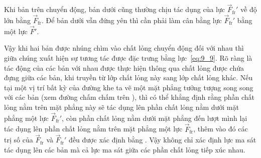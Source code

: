 
Khi bản trên chuyển động, bản dưới cũng thường chịu tác dụng của lực $\vec{F}_{\text{fr}}'$ về độ lớn bằng $\vec{F}_{\text{fr}}$. Để bản dưới vẫn đứng yên thì cần phải làm cân bằng lực $\vec{F}_{\text{fr}}'$ bằng một lực $\vec{F}'$.


Vậy khi hai bản được nhúng chìm vào chất lỏng chuyển động đối với nhau thì giữa chúng xuất hiện sự tương tác được đặc trưng bằng lực~\eqref{eq:9_9}. Rõ ràng là tác động của các bản với nhau được thực hiện thông qua chất lỏng được chứa đựng giữa các bản, khi truyền từ lớp chất lỏng này sang lớp chất lỏng khác. Nếu tại một vị trí bất kỳ của đường khe ta vẽ một mặt phẳng tưởng tượng song song với các bản (xem đường chấm chấm trên ), thì có thể khẳng định rằng phần chất lỏng nằm trên mặt phẳng này sẽ tác dụng lên phần chất lỏng nằm dưới mặt phẳng một lực $\vec{F}_{\text{fr}}'$, còn phần chất lỏng nằm dưới mặt phẳng đến lượt mình lại tác dụng lên phần chất lỏng nằm trên mặt phẳng một lực $\vec{F}_{\text{fr}}$, thêm vào đó các trị số của $\vec{F}_{\text{fr}}$ và $\vec{F}_{\text{fr}}'$ đều được xác định bằng . Vậy  không chỉ xác định lực ma sát tác dụng lên các bản mà cả lực ma sát giữa các phần chất lỏng tiếp xúc nhau.


